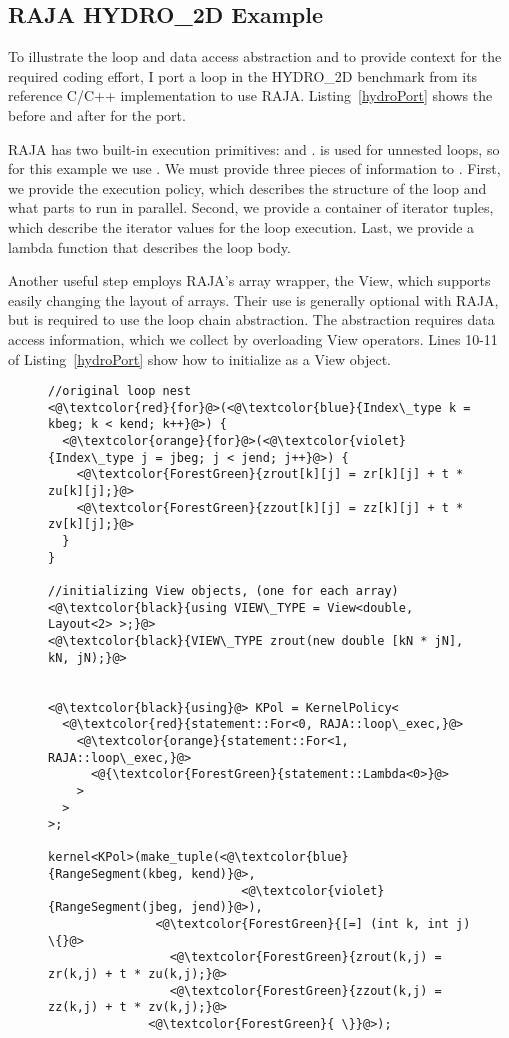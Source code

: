 \subsection{RAJA HYDRO\_2D Example}
To illustrate the loop and data access abstraction and to provide context
for the required coding effort, I port a loop in the HYDRO\_2D benchmark
from its reference C/C++ implementation to use RAJA.
Listing~\ref{hydroPort} shows the before and after for the port.

RAJA has two built-in execution primitives:  and .
 is used for unnested loops, so for this example we use
.
We must provide three pieces of information to . 
First, we provide the execution policy, which describes the structure of
the loop and what parts to run in parallel.
Second, we provide a container of iterator tuples, which describe the
iterator values for the loop execution.
Last, we provide a lambda function that describes the loop body.


Another useful step employs RAJA's array wrapper, the View, which supports
easily changing the layout of arrays.
Their use is generally optional with RAJA, but is required to use the loop
chain abstraction.
The abstraction requires data access information, which we collect by
overloading View operators.
Lines 10-11 of Listing~\ref{hydroPort} show how to initialize 
as a View object.

\begin{figure}
\begin{lstlisting}[label={hydroPort},
    caption={Hydro\_2D Loop (Color indicates code regions of original and RAJA versions that perform similar functions)}]
//original loop nest
<@\textcolor{red}{for}@>(<@\textcolor{blue}{Index\_type k = kbeg; k < kend; k++}@>) {
  <@\textcolor{orange}{for}@>(<@\textcolor{violet}{Index\_type j = jbeg; j < jend; j++}@>) {              
    <@\textcolor{ForestGreen}{zrout[k][j] = zr[k][j] + t * zu[k][j];}@>
    <@\textcolor{ForestGreen}{zzout[k][j] = zz[k][j] + t * zv[k][j];}@>
  }
}

//initializing View objects, (one for each array)
<@\textcolor{black}{using VIEW\_TYPE = View<double, Layout<2> >;}@>
<@\textcolor{black}{VIEW\_TYPE zrout(new double [kN * jN], kN, jN);}@>


<@\textcolor{black}{using}@> KPol = KernelPolicy<
  <@\textcolor{red}{statement::For<0, RAJA::loop\_exec,}@>
    <@\textcolor{orange}{statement::For<1, RAJA::loop\_exec,}@>
      <@{\textcolor{ForestGreen}{statement::Lambda<0>}@>
    >
  >
>;

kernel<KPol>(make_tuple(<@\textcolor{blue}{RangeSegment(kbeg, kend)}@>,
                           <@\textcolor{violet}{RangeSegment(jbeg, jend)}@>),
               <@\textcolor{ForestGreen}{[=] (int k, int j) \{}@>
                 <@\textcolor{ForestGreen}{zrout(k,j) = zr(k,j) + t * zu(k,j);}@>
                 <@\textcolor{ForestGreen}{zzout(k,j) = zz(k,j) + t * zv(k,j);}@>
              <@\textcolor{ForestGreen}{ \}}@>);
\end{lstlisting}
\end{figure}

